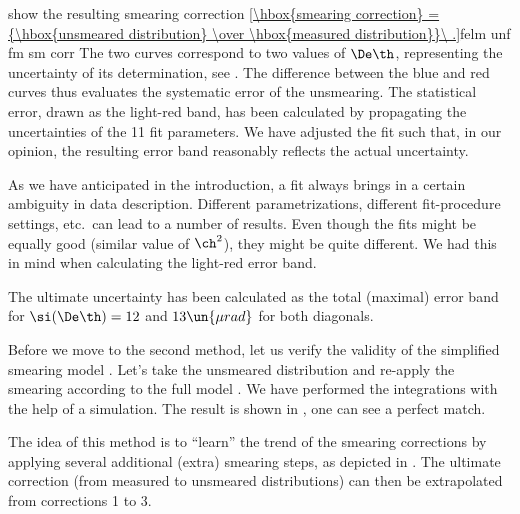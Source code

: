  show the resulting smearing correction
\eqref{\hbox{smearing correction} = {\hbox{unsmeared distribution} \over \hbox{measured distribution}}\ .}{felm unf fm sm corr}
The two curves correspond to two values of $\De\th$, representing the uncertainty of its determination, see . The difference between the blue and red curves thus evaluates the systematic error of the unsmearing. The statistical error, drawn as the light-red band, has been calculated by propagating the uncertainties of the 11 fit parameters. We have adjusted the fit such that, in our opinion, the resulting error band reasonably reflects the actual uncertainty.

As we have anticipated in the introduction, a fit always brings in a certain ambiguity in data description. Different parametrizations, different fit-procedure settings, etc.~can lead to a number of results. Even though the fits might be equally good (similar value of $\ch^2$), they might be quite different. We had this in mind when calculating the light-red error band.

The ultimate uncertainty has been calculated as the total (maximal) error band for $\si(\De\th) = 12$ and $13\un{\mu rad}$ for both diagonals.

Before we move to the second method, let us verify the validity of the simplified smearing model . Let's take the unsmeared distribution and re-apply the smearing according to the full model . We have performed the integrations with the help of a  simulation. The result is shown in , one can see a perfect match.



The idea of this method is to ``learn'' the trend of the smearing corrections by applying several additional (extra) smearing steps, as depicted in . The ultimate correction (from measured to unsmeared distributions) can then be extrapolated from corrections 1 to 3.


